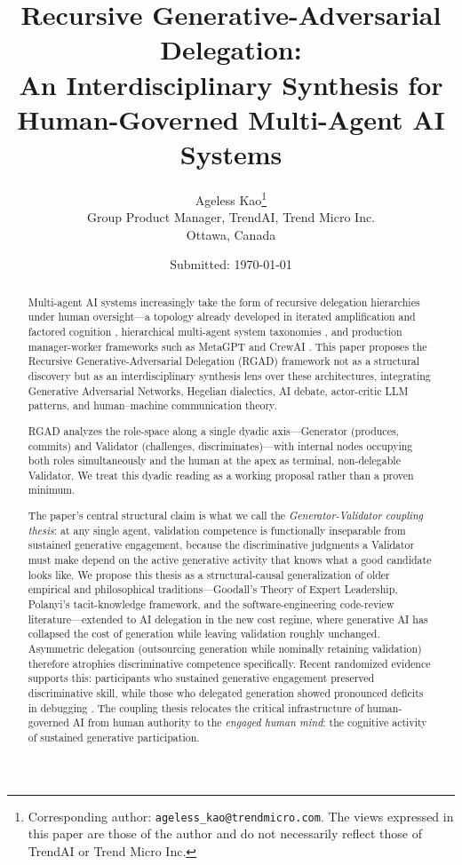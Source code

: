 \documentclass[11pt,a4paper]{article}
\title{Recursive Generative-Adversarial Delegation:\\[0.3em]
\large An Interdisciplinary Synthesis for Human-Governed Multi-Agent AI Systems}
\author{%
  Ageless Kao\thanks{Corresponding author: \texttt{ageless\_kao@trendmicro.com}. The views expressed in this paper are those of the author and do not necessarily reflect those of TrendAI or Trend Micro Inc.}\\
  \small Group Product Manager, TrendAI, Trend Micro Inc.\\
  \small Ottawa, Canada
}
\date{\small Submitted: \today}
\begin{document}
\maketitle

\begin{abstract}
Multi-agent AI systems increasingly take the form of recursive delegation hierarchies under human oversight---a topology already developed in iterated amplification and factored cognition \citep{christiano2018ida, christiano2016hch}, hierarchical multi-agent system taxonomies \citep{moore2025}, and production manager-worker frameworks such as MetaGPT and CrewAI \citep{hong2024metagpt}. This paper proposes the Recursive Generative-Adversarial Delegation (RGAD) framework not as a structural discovery but as an interdisciplinary synthesis lens over these architectures, integrating Generative Adversarial Networks, Hegelian dialectics, AI debate, actor-critic LLM patterns, and human--machine communication theory.

RGAD analyzes the role-space along a single dyadic axis---Generator (produces, commits) and Validator (challenges, discriminates)---with internal nodes occupying both roles simultaneously and the human at the apex as terminal, non-delegable Validator. We treat this dyadic reading as a working proposal rather than a proven minimum.

The paper's central structural claim is what we call the \emph{Generator-Validator coupling thesis}: at any single agent, validation competence is functionally inseparable from sustained generative engagement, because the discriminative judgments a Validator must make depend on the active generative activity that knows what a good candidate looks like. We propose this thesis as a structural-causal generalization of older empirical and philosophical traditions---Goodall's Theory of Expert Leadership, Polanyi's tacit-knowledge framework, and the software-engineering code-review literature---extended to AI delegation in the new cost regime, where generative AI has collapsed the cost of generation while leaving validation roughly unchanged. Asymmetric delegation (outsourcing generation while nominally retaining validation) therefore atrophies discriminative competence specifically. Recent randomized evidence supports this: participants who sustained generative engagement preserved discriminative skill, while those who delegated generation showed pronounced deficits in debugging \citep{shen2026}. The coupling thesis relocates the critical infrastructure of human-governed AI from human authority to the \emph{engaged human mind}: the cognitive activity of sustained generative participation.


\end{abstract}
\end{document}
